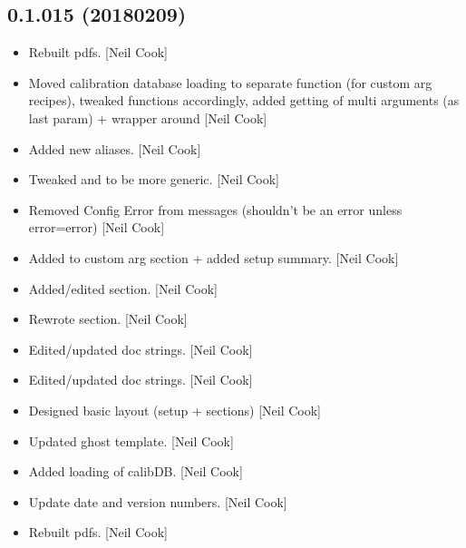 \documentclass[a4paper,10pt,english]{report}
\begin{document}
\subsection{0.1.015 (2018\sphinxhyphen{}02\sphinxhyphen{}09)}
\label{\detokenize{misc/changelog:id507}}\begin{itemize}
\item {} 
Rebuilt pdfs. {[}Neil Cook{]}

\item {} 
Moved calibration database loading to separate function (for custom
arg recipes), tweaked functions accordingly, added getting of multi
arguments (as last param) + wrapper around   {[}Neil
Cook{]}

\item {} 
Added new aliases. {[}Neil Cook{]}

\item {} 
Tweaked  and  to be more generic.
{[}Neil Cook{]}

\item {} 
Removed Config Error from messages (shouldn’t be an error unless
error=error) {[}Neil Cook{]}

\item {} 
Added to custom arg section + added setup summary. {[}Neil Cook{]}

\item {} 
Added/edited section. {[}Neil Cook{]}

\item {} 
Rewrote section. {[}Neil Cook{]}

\item {} 
Edited/updated doc strings. {[}Neil Cook{]}

\item {} 
Edited/updated doc strings. {[}Neil Cook{]}

\item {} 
Designed basic layout (setup + sections) {[}Neil Cook{]}

\item {} 
Updated ghost template. {[}Neil Cook{]}

\item {} 
Added loading of calibDB. {[}Neil Cook{]}

\item {} 
Update date and version numbers. {[}Neil Cook{]}

\item {} 
Rebuilt pdfs. {[}Neil Cook{]}


\end{itemize}
\end{document}
